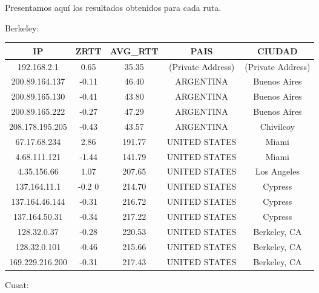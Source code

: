 Presentamos aquí los resultados obtenidos para cada ruta.

Berkeley:

\begin{tabular}{|c@{\hspace{5ex}}c@{\hspace{5ex}}c@{\hspace{5ex}}c@{\hspace{5ex}}c|}
 \hline
 \rule{0pt}{1.2em}IP & ZRTT & AVG\_RTT & PAIS & CIUDAD\\[0.2em]
 \hline

\rule{0pt}{1.2em} 192.168.2.1  &  0.65 & 35.35 & (Private Address) & (Private Address) \\[0.2em]
\rule{0pt}{1.2em} 200.89.164.137  &  -0.11 & 46.40 & ARGENTINA & Buenos Aires \\[0.2em]
\rule{0pt}{1.2em} 200.89.165.130  &  -0.41 & 43.80 & ARGENTINA & Buenos Aires \\[0.2em]
\rule{0pt}{1.2em} 200.89.165.222  &  -0.27 & 47.29 & ARGENTINA & Buenos Aires \\[0.2em]
\rule{0pt}{1.2em} 208.178.195.205  &  -0.43 & 43.57 & ARGENTINA & Chivilcoy \\[0.2em]
\rule{0pt}{1.2em} 67.17.68.234  &  2.86 & 191.77 & UNITED STATES & Miami \\[0.2em]
\rule{0pt}{1.2em} 4.68.111.121  &  -1.44 & 141.79 & UNITED STATES & Miami \\[0.2em]
\rule{0pt}{1.2em} 4.35.156.66  &  1.07 & 207.65 & UNITED STATES & Los Angeles \\[0.2em]
\rule{0pt}{1.2em} 137.164.11.1  &  -0.2 0& 214.70 & UNITED STATES & Cypress \\[0.2em]
\rule{0pt}{1.2em} 137.164.46.144  &  -0.31 & 216.72 & UNITED STATES & Cypress \\[0.2em]
\rule{0pt}{1.2em} 137.164.50.31  &  -0.34 & 217.22 & UNITED STATES & Cypress \\[0.2em]
\rule{0pt}{1.2em} 128.32.0.37  &  -0.28 & 220.53 & UNITED STATES & Berkeley, CA \\[0.2em]
\rule{0pt}{1.2em} 128.32.0.101  &  -0.46 & 215.66 & UNITED STATES & Berkeley, CA \\[0.2em]
\rule{0pt}{1.2em} 169.229.216.200  &  -0.31 & 217.43 & UNITED STATES & Berkeley, CA \\[0.2em]
\hline
 \end{tabular}

Cusat:

